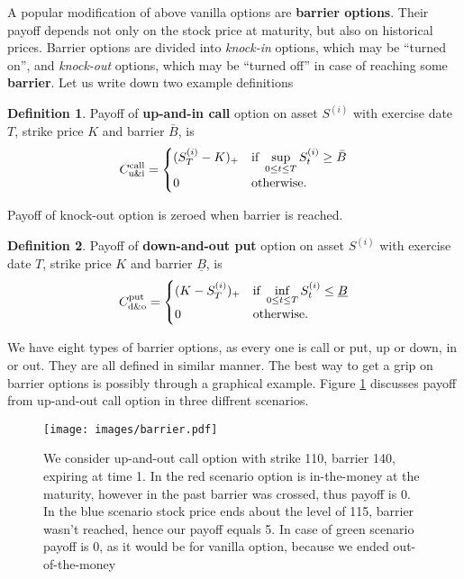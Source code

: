 \documentclass[a4paper,12pt, twoside]{article}
\theoremstyle{definition}
\newtheorem{mydef}{Definition}[section]
\theoremstyle{remark}
\begin{document}
A popular modification of above vanilla options are \textbf{barrier options}. Their payoff depends not only on the stock price at maturity, but also on historical prices. Barrier options are divided into \textit{knock-in} options, which may be ``turned on'', and \textit{knock-out} options, which may be ``turned off'' in case of reaching some \textbf{barrier}. Let us write down two example definitions
\begin{mydef}
Payoff of \textbf{up-and-in call} option on asset $S^{(i)}$ with exercise date $T$, strike price $K$ and barrier $\bar{B}$, is
\[ C^{\hbox{\scriptsize call}}_{\hbox{\scriptsize u\&i}} = 
\begin{cases}
 (S^{(i)}_T - K)_+    & \hbox{if } \sup\limits_{0 \leq t \leq T} S^{(i)}_t \geq \bar{B}\\
 0                    & \hbox{otherwise.}
\end{cases}
\]
\end{mydef}
Payoff of knock-out option is zeroed when barrier is reached.
\begin{mydef}
Payoff of \textbf{down-and-out put} option on asset $S^{(i)}$ with exercise date $T$, strike price $K$ and barrier $\underline{B}$, is
\[ C^{\hbox{\scriptsize put}}_{\hbox{\scriptsize d\&o}} = 
\begin{cases}
 (K - S^{(i)}_T)_+    & \hbox{if } \inf\limits_{0 \leq t \leq T} S^{(i)}_t \leq \underline{B}\\
 0                    & \hbox{otherwise.}
\end{cases}
\]
\end{mydef}
We have eight types of barrier options, as every one is call or put, up or down, in or out. They are all defined in similar manner. The best way to get a grip on barrier options is possibly through a graphical example. Figure \ref{fig:barrier} discusses payoff from up-and-out call option in three diffrent scenarios. 
\begin{figure}
\centering
 \texttt{[image: images/barrier.pdf]}
\caption{We consider up-and-out call option with strike 110, barrier 140, expiring at time 1. In the red scenario option is in-the-money at the maturity, however in the past barrier was crossed, thus payoff is 0. In the blue scenario stock price ends about the level of 115, barrier wasn't reached, hence our payoff equals 5. In case of green scenario payoff is 0, as it would be for vanilla option, because we ended out-of-the-money }
\label{fig:barrier}
\end{figure}
\end{document}
